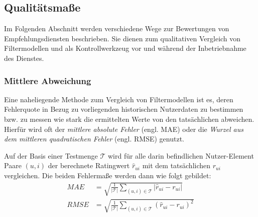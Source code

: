 \subsection{Qualitätsmaße}\label{sec:measures}
%
%

Im Folgenden Abschnitt werden verschiedene Wege zur Bewertungen von Empfehlungsdiensten beschrieben. Sie dienen zum qualitativen Vergleich von Filtermodellen und als Kontrollwerkzeug vor und während der Inbetriebnahme des Dienstes.

\subsubsection{Mittlere Abweichung}

Eine naheliegende Methode zum Vergleich von Filtermodellen ist es, deren Fehlerquote in Bezug zu vorliegenden historischen Nutzerdaten zu bestimmen bzw. zu messen wie stark die ermittelten Werte von den tatsächlichen abweichen. Hierfür wird oft der \textit{mittlere absolute Fehler} (engl. \acf{MAE}) oder die \textit{Wurzel aus dem mittleren quadratischen Fehler} (engl. \acf{RMSE}) genutzt.

Auf der Basis einer Testmenge $\mathcal{T}$ wird für alle darin befindlichen Nutzer-Element Paare $(u,i)$ der berechnete Ratingwert $\hat{r}_{ui}$ mit dem tatsächlichen $r_{ui}$ vergleichen. Die beiden Fehlermaße werden dann wie folgt gebildet:
\begin{align}
MAE & = \sqrt{\frac{1}{|\mathcal{T}|} \sum_{(u,i) \in \mathcal{T}}{|\hat{r}_{ui}-r_{ui}|}} \label{form:mae} \\
RMSE & = \sqrt{\frac{1}{|\mathcal{T}|} \sum_{(u,i) \in \mathcal{T}}{(\hat{r}_{ui}-r_{ui})^2}} \label{form:rmse}
\end{align}


